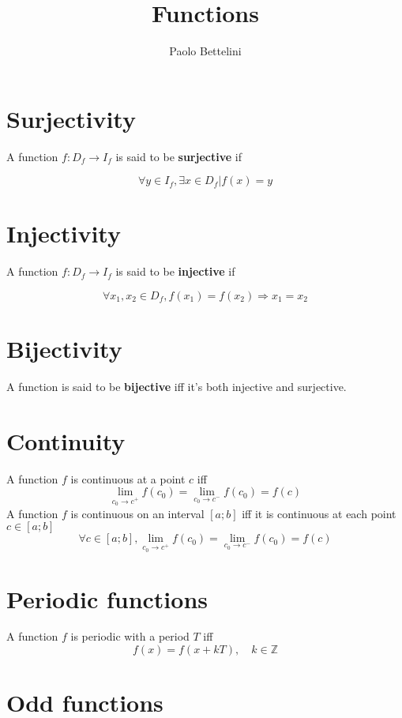 \documentclass{article}
\title{Functions}
\author{Paolo Bettelini}
\date{}
\begin{document}
\maketitle
\tableofcontents
\pagebreak

\section{Surjectivity}

A function \(f:D_f \to I_f\) is said to be \textbf{surjective} if

\[
    \forall y \in I_f, \exists x \in D_f | f(x) = y
\]

\section{Injectivity}

A function \(f:D_f \to I_f\) is said to be \textbf{injective} if

\[
    \forall x_1, x_2 \in D_f, f(x_1) = f(x_2) \Rightarrow x_1 = x_2 
\]

\section{Bijectivity}

A function is said to be \textbf{bijective} iff it's both injective
and surjective.

\section{Continuity}

A function \(f\) is continuous at a point \(c\) iff
\[
    \lim_{c_0 \to c^+} f(c_0) = \lim_{c_0 \to c^-} f(c_0) = f(c)
\]
A function \(f\) is continuous on an interval \([a;b]\) iff it is continuous at each point \(c \in [a;b]\)
\[
    \forall c \in [a;b],
    \lim_{c_0 \to c^+} f(c_0) = \lim_{c_0 \to c^-} f(c_0) = f(c)
\]

\section{Periodic functions}

A function \(f\) is periodic with a period \(T\) iff
\[
    f(x) = f(x + kT), \quad k \in \mathbb{Z}
\]

\section{Odd functions}
\end{document}
